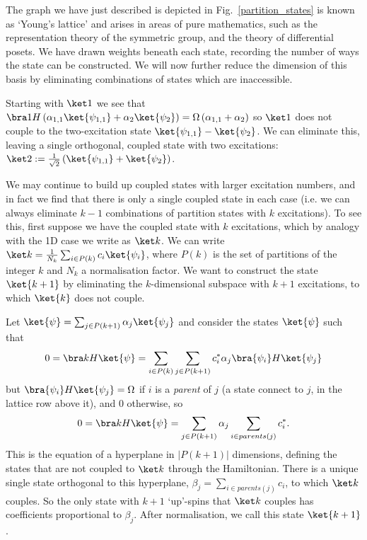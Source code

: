 The graph we have just described is depicted in Fig.~\ref{partition_states}  is known as `Young's lattice' and arises in areas of pure mathematics, such as the representation theory of the symmetric group, and the theory of differential posets. We have drawn weights beneath each state, recording the number of ways the state can be constructed. We will now further reduce the dimension of this basis
by eliminating combinations of states which are inaccessible.

Starting with $\ket 1$ we see that $\bra 1H\left(\alpha_{1,1}\ket{\psi_{1,1}}+ \alpha_{2}\ket{\psi_{2}}\right) =\Omega\left(\alpha_{1,1}+ \alpha_{2}\right)$ so $\ket 1$ does not couple to the two-excitation state $\ket{\psi_{1,1}}-\ket{\psi_{2}}$. We can eliminate this, leaving a single orthogonal, coupled state with two excitations: $\ket 2 := \frac{1}{\sqrt{2}}\left( \ket{\psi_{1,1}}+\ket{\psi_2} \right)$.

We may continue to build up coupled states with larger excitation numbers, and in fact we find that there is only a single coupled state in each case (i.e. we can always eliminate $k-1$ combinations of partition states with $k$ excitations).  To see this, first suppose we have the coupled state with $k$ excitations, which by analogy with the 1D case we write as $\ket k$. We can write $\ket k=\frac{1}{N_k}\sum_{i\in P(k)}c_{i}\ket{\psi_{i}}$, where $P(k)$ is the set of partitions of the integer $k$ and $N_k$ a normalisation factor. We want to construct the state $\ket{k+1}$ by eliminating the $k$-dimensional subspace with $k+1$ excitations, to which $\ket{k}$ does not couple.

Let $\ket{\psi}=\sum_{j\in P(k+1)}\alpha_{j}\ket{\psi_{j}}$ and consider the states $\ket{\psi}$ such that \[ 0=\bra kH\ket{\psi}=\sum_{i\in P(k)}\sum_{j\in P(k+1)}c_{i}^{*}\alpha_{j}\bra{\psi_{i}}H\ket{\psi_{j}}\] but $\bra{\psi_{i}}H\ket{\psi_{j}}=\Omega$ if $i$ is a {\it parent} of $j$ (a state connect to $j$, in the lattice row above it), and $0$ otherwise, so \[0=\bra kH\ket{\psi}=\sum_{j\in P(k+1)}\alpha_{j}\sum_{i\in parents(j)}c_{i}^{*}.\] This is the equation of a hyperplane in $|P(k+1)|$ dimensions, defining the states that are not coupled to $\ket k$ through the Hamiltonian.  There is a unique single state orthogonal to this hyperplane, $\beta_{j}=\sum_{i\in parents(j)}c_{i}$, to which $\ket k$ couples.  So the only state with $k+1$ `up'-spins that $\ket k$ couples has coefficients proportional to $\beta_{j}$. After normalisation, we call this state $\ket{k+1}$.

